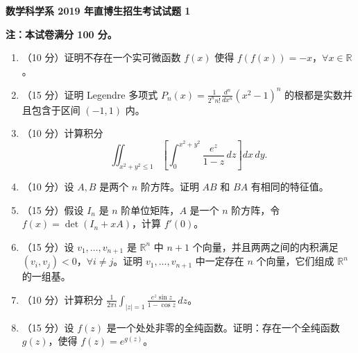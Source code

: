 \documentclass[UTF8,11pt,fontset=none]{ctexart}
\newcommand{\paperheading}[1]{\begin{center}\Large\bfseries #1\end{center}\vspace{.45em}}
\newcommand{\newpaper}[1]{\clearpage\paperheading{#1}}
\begin{document}
\newpaper{数学科学系 2019 年直博生招生考试试题 1}
\textbf{注：本试卷满分 100 分。}
\begin{enumerate}
\item （10 分）证明不存在一个实可微函数 $f(x)$ 使得 $f(f(x))=-x$，$\forall x\in\mathbb R$。
\item （15 分）证明 Legendre 多项式
$\displaystyle P_n(x)=\frac1{2^n n!}\frac{d^n}{dx^n}(x^2-1)^n$
的根都是实数并且包含于区间 $(-1,1)$ 内。
\item （10 分）计算积分
\[
\iint_{x^2+y^2\le1}\left[\int_0^{x^2+y^2}\frac{e^z}{1-z}\,dz\right]dx\,dy.
\]
\item （10 分）设 $A,B$ 是两个 $n$ 阶方阵。证明 $AB$ 和 $BA$ 有相同的特征值。
\item （15 分）假设 $I_n$ 是 $n$ 阶单位矩阵，$A$ 是一个 $n$ 阶方阵，令 $f(x)=\det(I_n+xA)$，计算 $f'(0)$。
\item （15 分）设 $v_1,\ldots,v_{n+1}$ 是 $\mathbb R^n$ 中 $n+1$ 个向量，并且两两之间的内积满足 $(v_i,v_j)<0$，$\forall i\ne j$。证明 $v_1,\ldots,v_{n+1}$ 中一定存在 $n$ 个向量，它们组成 $\mathbb R^n$ 的一组基。
\item （10 分）计算积分
$\displaystyle\frac1{2\pi i}\int_{|z|=1}\frac{e^z\sin z}{1-\cos z}\,dz$。
\item （15 分）设 $f(z)$ 是一个处处非零的全纯函数。证明：存在一个全纯函数 $g(z)$，使得 $f(z)=e^{g(z)}$。
\end{enumerate}
\end{document}
